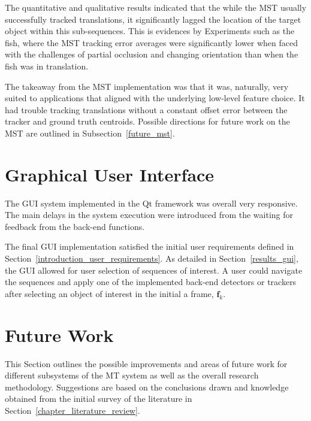 The quantitative and qualitative results indicated that the while the MST
usually successfully tracked translations, it significantly
lagged the location of the target object within this sub-sequences. This is
evidences by Experiments such as the fish, where the MST tracking error averages
were significantly lower when faced with the challenges of partial occlusion and
changing orientation than when the fish was in translation.

The takeaway from the MST implementation was that it was, naturally, very suited to
applications that aligned with the underlying low-level feature choice. It had
trouble tracking translations without a constant offset error between the
tracker and ground truth centroids. Possible directions for future work on the
MST are outlined in Subsection~\ref{future_mst}.

\section{Graphical User Interface}
The GUI system implemented in the Qt framework was overall very responsive. The
main delays in the system execution were introduced from the waiting for
feedback from the back-end functions.

The final GUI implementation satisfied the initial user requirements defined in
Section~\ref{introduction_user_requirements}. As detailed in
Section~\ref{results_gui}, the GUI allowed for user selection of sequences of
interest. A user could navigate the sequences and apply one of the implemented
back-end detectors or trackers after selecting an object of interest in the
initial a frame, $\mathbf{f}_k$.

\section{Future Work}\label{future}
This Section outlines the possible improvements and areas
of future work for different subsystems of the MT system as well as the overall
research methodology. Suggestions are based
on the conclusions drawn and knowledge obtained from the initial survey of the
literature in Section~\ref{chapter_literature_review}.

